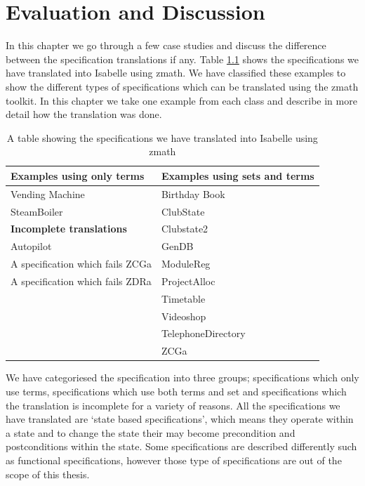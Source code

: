 \chapter{Evaluation and Discussion}
\label{ch:evaluation}

In this chapter we go through a few case studies and discuss the difference between the specification translations if any. Table \ref{tab:specstranslated} shows the specifications we have translated into Isabelle using \gls{zmath}. We have classified these examples to show the different types of specifications which can be translated using the \gls{zmath} toolkit. In this chapter we take one example from each class and describe in more detail how the translation was done.

\begin{table}[H]
\begin{tabular}{|l|l|}
\hline
\textbf{Examples using only terms} & \textbf{Examples using sets and terms} \\
\hline
Vending Machine & Birthday Book \\
SteamBoiler & ClubState \\
\cline{1-1}
\cline{1-1}
\textbf{Incomplete translations} & Clubstate2 \\
\cline{1-1}
Autopilot & GenDB \\
A specification which fails ZCGa & ModuleReg \\
A specification which fails ZDRa & ProjectAlloc \\
& Timetable \\
& Videoshop \\
& TelephoneDirectory \\
& ZCGa \\
\hline
\end{tabular}
\caption{A table showing the specifications we have translated into Isabelle using \gls{zmath} \label{tab:specstranslated}}
\end{table}

We have categoriesed the specification into three groups; specifications which only use terms, specifications which use both terms and set and specifications which the translation is incomplete for a variety of reasons. All the specifications we have translated are `state based specifications', which means they operate within a state and to change the state their may become precondition and postconditions within the state. Some specifications are described differently such as functional specifications, however those type of specifications are out of the scope of this thesis.

